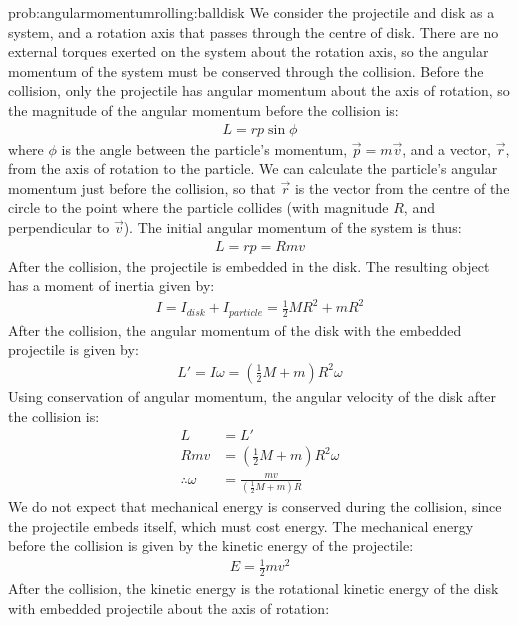 \begin{solution}{prob:angularmomentumrolling:balldisk}\label{soln:angularmomentumrolling:balldisk}
We consider the projectile and disk as a system, and a rotation axis that passes through the centre of disk. There are no external torques exerted on the system about the rotation axis, so the angular momentum of the system must be conserved through the collision. Before the collision, only the projectile has angular momentum about the axis of rotation, so the magnitude of the angular momentum before the collision is:
\begin{align*}
L = rp\sin\phi
\end{align*}
where $\phi$ is the angle between the particle's momentum, $\vec p=m\vec v$, and a vector, $\vec r$, from the axis of rotation to the particle. We can calculate the particle's angular momentum just before the collision, so that $\vec r$ is the vector from the centre of the circle to the point where the particle collides (with magnitude $R$, and perpendicular to $\vec v$). The initial angular momentum of the system is thus:
\begin{align*}
L=rp=Rmv
\end{align*}
After the collision, the projectile is embedded in the disk. The resulting object has a moment of inertia given by:
\begin{align*}
I = I_{disk}+ I_{particle} = \frac{1}{2}MR^2+mR^2
\end{align*} 
After the collision, the angular momentum of the disk with the embedded projectile is given by:
\begin{align*}
L'=I\omega = \left(\frac{1}{2}M+m\right)R^2\omega
\end{align*}
Using conservation of angular momentum, the angular velocity of the disk after the collision is:
\begin{align*}
L &= L'\\
Rmv &= \left(\frac{1}{2}M+m\right)R^2\omega\\
\therefore \omega &= \frac{mv}{\left(\frac{1}{2}M+m\right)R}
\end{align*}
We do not expect that mechanical energy is conserved during the collision, since the projectile embeds itself, which must cost energy. The mechanical energy before the collision is given by the kinetic energy of the projectile:
\begin{align*}
E = \frac{1}{2}mv^2
\end{align*}
After the collision, the kinetic energy is the rotational kinetic energy of the disk with embedded projectile about the axis of rotation:

\end{solution}
